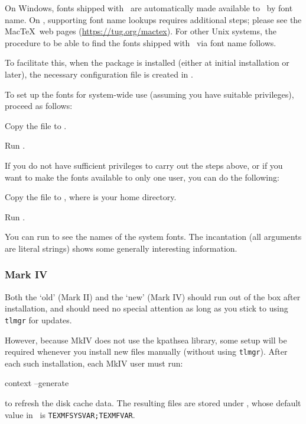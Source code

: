 \documentclass{article}
\begin{document}
On Windows, fonts shipped with \TL\ are automatically made available to
\XeTeX\ by font name.  On \MacOSX, supporting font name lookups requires
additional steps; please see the Mac\TeX\ web pages
(\url{https://tug.org/mactex}).  For other Unix systems, the procedure to
be able to find the fonts shipped with \TL\ via font name follows.

To facilitate this, when the  package is installed
(either at initial installation or later), the necessary configuration
file is created in
.

To set up the \TL{} fonts for system-wide use (assuming you have
suitable privileges), proceed as follows:
\begin{enumerate*}
\item Copy the  file to
.
\item Run .
\end{enumerate*}

If you do not have sufficient privileges to carry out the steps above,
or if you want to make the \TL{} fonts available to only one user,
you can do the following:
\begin{enumerate*}
\item Copy the  file to
      , where \filename{~} is your home directory.
\item Run .
\end{enumerate*}

You can run  to see the names of the system fonts.  The
incantation  (all arguments
are literal strings) shows some generally interesting information.


\subsubsection{\protect\ConTeXt{} Mark IV}
\label{sec:context-mkiv}

Both the `old' \ConTeXt{} (Mark II) and the `new' \ConTeXt{}
(Mark IV) should run out of the box after \TL{} installation,
and should need no special attention as long as you stick to
using \verb+tlmgr+ for updates.

However, because \ConTeXt{} MkIV does not use the kpathsea
library, some setup will be required whenever you install new 
files manually (without using \verb+tlmgr+). After each such 
installation, each MkIV user must run:
\begin{sverbatim}
context --generate
\end{sverbatim}
to refresh the \ConTeXt{} disk cache data.
The resulting files are stored under ,
whose default value in \TL\ is \verb+TEXMFSYSVAR;TEXMFVAR+. 
\end{document}

